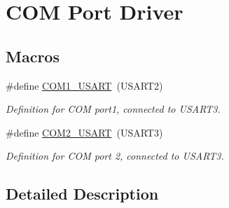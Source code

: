 \hypertarget{group__com__port__driver}{\section{C\-O\-M Port Driver}
\label{group__com__port__driver}
}
\subsection*{Macros}
\begin{DoxyCompactItemize}
\item 
\hypertarget{group__com__port__driver_ga5e1bf137a61b8d8536c6ddf16db0b2e3}{\#define \hyperlink{group__com__port__driver_ga5e1bf137a61b8d8536c6ddf16db0b2e3}{C\-O\-M1\-\_\-\-U\-S\-A\-R\-T}~(U\-S\-A\-R\-T2)}\label{group__com__port__driver_ga5e1bf137a61b8d8536c6ddf16db0b2e3}

\begin{DoxyCompactList}\small\item\em Definition for C\-O\-M port1, connected to U\-S\-A\-R\-T3. \end{DoxyCompactList}\item 
\hypertarget{group__com__port__driver_ga5907fc16d2de43c1f80f0de8b68a577a}{\#define \hyperlink{group__com__port__driver_ga5907fc16d2de43c1f80f0de8b68a577a}{C\-O\-M2\-\_\-\-U\-S\-A\-R\-T}~(U\-S\-A\-R\-T3)}\label{group__com__port__driver_ga5907fc16d2de43c1f80f0de8b68a577a}

\begin{DoxyCompactList}\small\item\em Definition for C\-O\-M port 2, connected to U\-S\-A\-R\-T3. \end{DoxyCompactList}\end{DoxyCompactItemize}


\subsection{Detailed Description}
